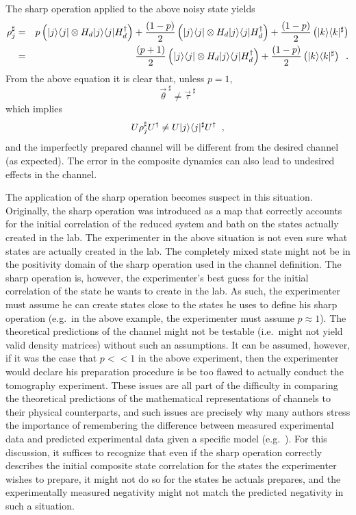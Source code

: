 The sharp operation applied to the above noisy state yields
\begin{eqnarray*}
\rho_j^\sharp &=& p\left(|j\rangle\langle j|\otimes H_d|j\rangle\langle j|H_d^\dagger\right) + \frac{(1-p)}{2}\left(|j\rangle\langle j|\otimes H_d|j\rangle\langle j|H_d^\dagger\right)+\frac{(1-p)}{2}\left(|k\rangle\langle k|^\sharp\right)\\
&=&\frac{(p+1)}{2}\left(|j\rangle\langle j|\otimes H_d|j\rangle\langle j|H_d^\dagger\right)+\frac{(1-p)}{2}\left(|k\rangle\langle k|^\sharp\right)\;\;.
\end{eqnarray*}
From the above equation it is clear that, unless $p=1$,
$$
\vec{\theta}^{\;\sharp} \neq \vec{\tau}^{\;\sharp}
$$
which implies
$$
U\rho_j^\sharp U^\dagger \neq U|j\rangle\langle j|^\sharp U^\dagger\;\;,
$$
and the imperfectly prepared channel will be different from the desired channel (as expected).  The error in the composite dynamics can also lead to undesired effects in the channel.  

The application of the sharp operation becomes suspect in this situation.  Originally, the sharp operation was introduced as a map that correctly accounts for the initial correlation of the reduced system and bath on the states actually created in the lab.  The experimenter in the above situation is not even sure what states are actually created in the lab.  The completely mixed state might not be in the positivity domain of the sharp operation used in the channel definition.  The sharp operation is, however, the experimenter's best guess for the initial correlation of the state he wants to create in the lab.  As such, the experimenter must assume he can create states close to the states he uses to define his sharp operation (e.g.\ in the above example, the experimenter must assume $p \approx 1$).  The theoretical predictions of the channel might not be testable (i.e.\ might not yield valid density matrices) without such an assumptions.  It can be assumed, however, if it was the case that $p<< 1$ in the above experiment, then the experimenter would declare his preparation procedure is be too flawed to actually conduct the tomography experiment.  These issues are all part of the difficulty in comparing the theoretical predictions of the mathematical representations of channels to their physical counterparts, and such issues are precisely why many authors stress the importance of remembering the difference between measured experimental data and predicted experimental data given a specific model (e.g.\ \cite{Sudarshen2007}).  For this discussion, it suffices to recognize that even if the sharp operation correctly describes the initial composite state correlation for the states the experimenter wishes to prepare, it might not do so for the states he actuals prepares, and the experimentally measured negativity might not match the predicted negativity in such a situation.

